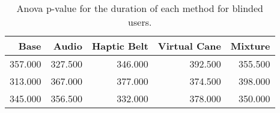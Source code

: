 
\begin{table}[!htb]
\centering
\caption{Anova p-value for the duration of each method for blinded users.}
\label{tab:anova_duration}
\begin{tabular}{rrrrr}
\toprule
   Base &   Audio &  Haptic Belt &  Virtual Cane &  Mixture \\
\midrule
357.000 & 327.500 &      346.000 &       392.500 &  355.500 \\
313.000 & 367.000 &      377.000 &       374.500 &  398.000 \\
345.000 & 356.500 &      332.000 &       378.000 &  350.000 \\
\bottomrule
\end{tabular}
\end{table}

